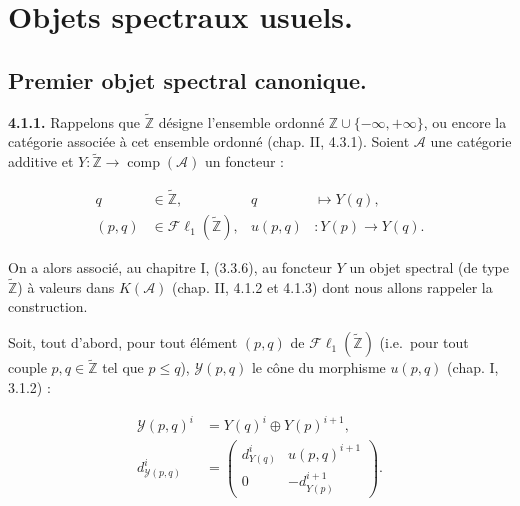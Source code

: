 \chapter{Objets spectraux usuels.}
%
\begingroup
\small
\setlength{\parskip}{0pt}
\setlength{\emergencystretch}{1.5em}
\setlength{\abovedisplayskip}{4pt plus 2pt minus 2pt}%
\setlength{\belowdisplayskip}{4pt plus 2pt minus 2pt}%

\section{Premier objet spectral canonique.}

\noindent\textbf{4.1.1.}\quad
Rappelons que $\widetilde{\mathbb Z}$ désigne l'ensemble ordonné
$\mathbb Z\cup\{-\infty,+\infty\}$, ou encore la catégorie associée à cet
ensemble ordonné (chap. II, 4.3.1). Soient $\mathcal A$ une catégorie
additive et $Y\colon\widetilde{\mathbb Z}\longrightarrow
\operatorname{comp}(\mathcal A)$ un foncteur :

\begin{equation}
\begin{aligned}
q&\in\widetilde{\mathbb Z},
  &q&\longmapsto Y(q),\\
(p,q)&\in\mathcal{F}\ell_1(\widetilde{\mathbb Z}),
  &u(p,q)&\colon Y(p)\longrightarrow Y(q).
\end{aligned}
\tag{4.1.1.1}
\end{equation}

On a alors associé, au chapitre I, (3.3.6), au foncteur $Y$ un objet
spectral (de type $\widetilde{\mathbb Z}$) à valeurs dans $K(\mathcal A)$
(chap. II, 4.1.2 et 4.1.3) dont nous allons rappeler la construction.

Soit, tout d'abord, pour tout élément $(p,q)$ de
$\mathcal{F}\ell_1(\widetilde{\mathbb Z})$ (i.e.\ pour tout couple
$p,q\in\widetilde{\mathbb Z}$ tel que $p\leq q$), $\mathcal Y(p,q)$ le
cône du morphisme $u(p,q)$ (chap. I, 3.1.2) :

\begin{equation}
\begin{aligned}
\mathcal Y(p,q)^i&=Y(q)^i\oplus Y(p)^{i+1},\\
d_{\mathcal Y(p,q)}^i
&=
\begin{pmatrix}
d_{Y(q)}^i & u(p,q)^{i+1}\\
0 & -d_{Y(p)}^{i+1}
\end{pmatrix}.
\end{aligned}
\tag{4.1.1.2}
\end{equation}


